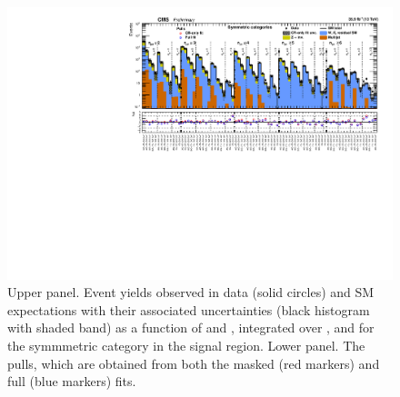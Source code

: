 \clearpage
\begin{figure}[h!]
  \centering
  \caption{Upper panel. Event yields observed in data (solid circles)
    and SM expectations with their associated uncertainties (black
    histogram with shaded band) as a function of \nb and \scalht,
    integrated over \mht, and for the symmmetric \njet category
    in the signal region. Lower panel. The pulls, which are obtained
    from both the masked (red markers) and full (blue markers) fits. }
  \label{fig:mr_symm_pulls}
  \includegraphics[width=1.\linewidth]{figures/results/36invfb_preapproval/symm/summaryPlot_Symmetric_prefit_overlay_fit_b}
\end{figure}


